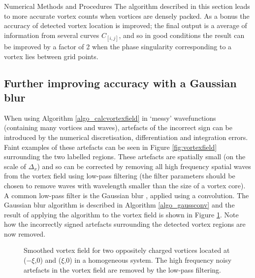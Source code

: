 \begin{chapter}{\label{cha:numerics}Numerical Methods and Procedures}
The algorithm described in this section leads to more accurate vortex counts when vortices are densely packed. As a bonus the accuracy of detected vortex location is improved; the final output is a average of information from several curves $C_{[i,j]}$, and so in good conditions the result can be improved by a factor of 2 when the phase singularity corresponding to a vortex lies between grid points.

\subsection{\label{section:gaussianblur} Further improving accuracy with a Gaussian blur}
When using Algorithm \ref{algo_calcvortexfield} in `messy' wavefunctions (containing many vortices and waves), artefacts of the incorrect sign can be introduced by the numerical discretisation, differentiation and integration errors. Faint examples of these artefacts can be seen in Figure \ref{fig:vortexfield} surrounding the two labelled regions. These artefacts are spatially small (on the scale of $\Delta_x$) and so can be corrected by removing all high frequency spatial waves from the vortex field using low-pass filtering (the filter parameters should be chosen to remove waves with wavelength smaller than the size of a vortex core). A common low-pass filter is the Gaussian blur \cite{shapiro2001computer}, applied using a convolution. The Gaussian blur algorithm is described in Algorithm \ref{algo_gaussconv} and the result of applying the algorithm to the vortex field is shown in Figure \ref{fig:vortexfieldsmooth}. Note how the incorrectly signed artefacts surrounding the detected vortex regions are now removed.
\begin{figure}
  \centering
  \caption{Smoothed vortex field for two oppositely charged vortices located at ($-\xi$,0) and ($\xi$,0) in a homogeneous system. The high frequency noisy artefacts in the vortex field are removed by the low-pass filtering.\label{fig:vortexfieldsmooth} }
 \end{figure}


\end{chapter}

